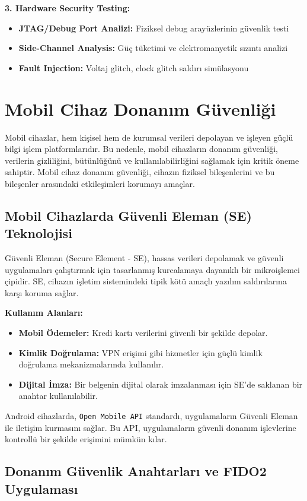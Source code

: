 \textbf{3. Hardware Security Testing:}
\begin{itemize}
    \item \textbf{JTAG/Debug Port Analizi:} Fiziksel debug arayüzlerinin güvenlik testi
    \item \textbf{Side-Channel Analysis:} Güç tüketimi ve elektromanyetik sızıntı analizi
    \item \textbf{Fault Injection:} Voltaj glitch, clock glitch saldırı simülasyonu
\end{itemize}

\section{Mobil Cihaz Donanım Güvenliği}
Mobil cihazlar, hem kişisel hem de kurumsal verileri depolayan ve işleyen güçlü bilgi işlem platformlarıdır. Bu nedenle, mobil cihazların donanım güvenliği, verilerin gizliliğini, bütünlüğünü ve kullanılabilirliğini sağlamak için kritik öneme sahiptir. Mobil cihaz donanım güvenliği, cihazın fiziksel bileşenlerini ve bu bileşenler arasındaki etkileşimleri korumayı amaçlar.

\subsection{Mobil Cihazlarda Güvenli Eleman (SE) Teknolojisi}

Güvenli Eleman (Secure Element - SE), hassas verileri depolamak ve güvenli uygulamaları çalıştırmak için tasarlanmış kurcalamaya dayanıklı bir mikroişlemci çipidir. SE, cihazın işletim sistemindeki tipik kötü amaçlı yazılım saldırılarına karşı koruma sağlar.

\textbf{Kullanım Alanları:}
\begin{itemize}
    \item \textbf{Mobil Ödemeler:} Kredi kartı verilerini güvenli bir şekilde depolar.
    \item \textbf{Kimlik Doğrulama:} VPN erişimi gibi hizmetler için güçlü kimlik doğrulama mekanizmalarında kullanılır.
    \item \textbf{Dijital İmza:} Bir belgenin dijital olarak imzalanması için SE'de saklanan bir anahtar kullanılabilir.
\end{itemize}
Android cihazlarda, \verb|Open Mobile API| standardı, uygulamaların Güvenli Eleman ile iletişim kurmasını sağlar. Bu API, uygulamaların güvenli donanım işlevlerine kontrollü bir şekilde erişimini mümkün kılar.

\subsection{Donanım Güvenlik Anahtarları ve FIDO2 Uygulaması}


